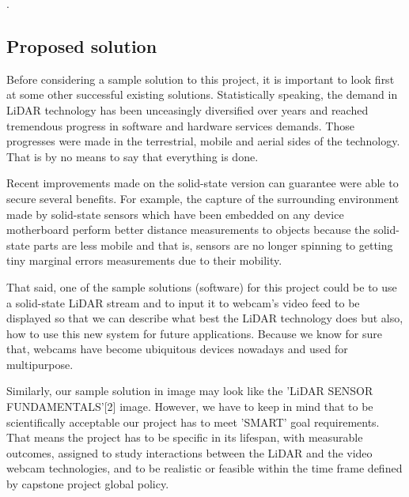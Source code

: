 \documentclass[10pt,draftclsnofoot,onecolumn,journal,compsoc]{IEEEtran}
\begin{document}
.   


\subsection{Proposed solution}
Before considering a sample solution to this project, it is important to look first at some other successful existing solutions. Statistically speaking, the demand in LiDAR technology has been unceasingly diversified over years and reached tremendous progress in software and hardware services demands. Those progresses were made in  the  terrestrial, mobile and aerial sides of the technology. That is by no means to say that everything is done.\par

Recent improvements made on the solid-state version can guarantee were able to secure several benefits. For example, the capture of the surrounding environment made by solid-state sensors which have been embedded on any device motherboard perform better distance measurements to objects because the solid-state parts are less mobile and that is, sensors are no longer spinning to getting tiny marginal errors measurements due to their mobility. \par

That said, one of the sample solutions (software) for this project could be to use a solid-state LiDAR stream and to input it to webcam's video feed to be displayed so that we can describe what best the LiDAR technology does but also, how to use this new system for future applications. Because we know for sure that, webcams  have become ubiquitous devices nowadays and used for multipurpose. \par

 Similarly, our sample solution in image may look like the 'LiDAR SENSOR FUNDAMENTALS'[2] image. However, we have to keep in mind that to be scientifically acceptable our project has to meet 'SMART' goal requirements. That means the  project has to be specific in its lifespan, with   measurable outcomes, assigned to study  interactions between the LiDAR and the video webcam technologies, and to be  realistic or feasible within the time frame  defined by capstone project global policy.  
\end{document}
